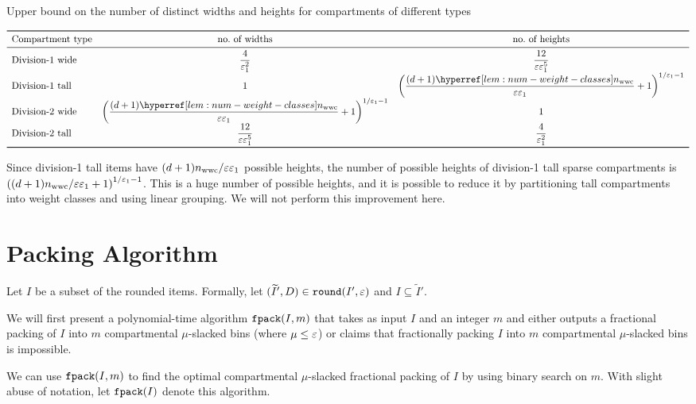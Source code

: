 \begin{table}[htb]
\centering
\caption{Upper bound on the number of distinct widths and heights for
compartments of different types}
\[ \begin{array}{l*2{>{\displaystyle}c}}
\toprule \textrm{Compartment type} & \textrm{no.~of widths} & \textrm{no.~of heights}
\\ \midrule \textrm{Division-1 wide}
    & \frac{4}{\epsLarge^2}
    & \frac{12}{\eps\epsLarge^5}
\\[\defaultaddspace] \textrm{Division-1 tall}
    & 1
    & \left(\frac{(d+1)\nwwcHyp}{\eps\epsLarge} + 1\right)^{1/\epsLarge-1}
\\[\defaultaddspace] \textrm{Division-2 wide}
    & \left(\frac{(d+1)\nwwcHyp}{\eps\epsLarge} + 1\right)^{1/\epsLarge-1}
    & 1
\\[\defaultaddspace] \textrm{Division-2 tall}
    & \frac{12}{\eps\epsLarge^5}
    & \frac{4}{\epsLarge^2}
\\ \bottomrule
\end{array} \]
\end{table}

Since division-1 tall items have $(d+1)n_{\mathrm{wwc}}/\varepsilon\varepsilon_1$ possible heights,
the number of possible heights of division-1 tall sparse compartments is
$\left((d+1)n_{\mathrm{wwc}}/\varepsilon\varepsilon_1 + 1\right)^{1/\varepsilon_1-1}$.
This is a huge number of possible heights, and it is possible to reduce it by partitioning
tall compartments into weight classes and using linear grouping.
We will not perform this improvement here.

\section{Packing Algorithm}
\label{sec:gv-rbbp:pack}

Let $I$ be a subset of the rounded items. Formally,
let $(\widetilde{I}', D) \in \operatorname{\mathtt{round}}(I', \varepsilon)$ and $I \subseteq \widetilde{I}'$.

We will first present a polynomial-time algorithm
$\operatorname{\mathtt{fpack}}(I, m)$ that takes as input $I$ and an integer $m$ and either outputs
a fractional packing of $I$ into $m$ compartmental $\mu$-slacked bins
(where $\mu \le \varepsilon$) or claims that fractionally packing $I$ into $m$
compartmental $\mu$-slacked bins is impossible.

We can use $\operatorname{\mathtt{fpack}}(I, m)$ to find the optimal compartmental $\mu$-slacked
fractional packing of $I$ by using binary search on $m$.
With slight abuse of notation, let $\operatorname{\mathtt{fpack}}(I)$ denote this algorithm.


